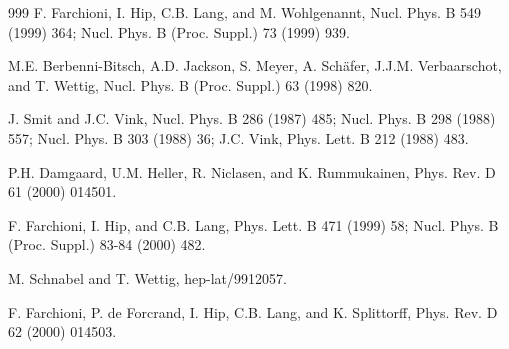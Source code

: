 \begin{thebibliography}{999}
                      F. Farchioni, I. Hip, C.B. Lang, and M. Wohlgenannt,
                      Nucl. Phys. B 549 (1999) 364;           %
                      Nucl. Phys. B (Proc. Suppl.) 73 (1999) 939.     %

  M.E. Berbenni-Bitsch, A.D. Jackson, S. Meyer,
                      A. Sch\"afer, J.J.M. Verbaarschot, and T. Wettig,
                      Nucl. Phys. B (Proc. Suppl.) 63 (1998) 820.     %

      J. Smit and J.C. Vink, 
                      Nucl. Phys. B 286 (1987) 485;         %
                      Nucl. Phys. B 298 (1988) 557;         %
                      Nucl. Phys. B 303 (1988) 36;          %
                      J.C. Vink, 
                      Phys. Lett. B 212 (1988) 483.         %

                      P.H. Damgaard, U.M. Heller, R. Niclasen, and
                      K. Rummukainen, 
                      Phys. Rev. D 61 (2000) 014501.           %

                      F. Farchioni, I. Hip, and C.B. Lang, 
                      Phys. Lett. B 471 (1999) 58;              %
                      Nucl. Phys. B (Proc. Suppl.) 83-84 (2000) 482.

       M. Schnabel and T. Wettig,
                      hep-lat/9912057.                          %

     F. Farchioni, P. de Forcrand, I. Hip, C.B. Lang,
                      and K. Splittorff, 
                      Phys. Rev. D 62 (2000) 014503.


\end{thebibliography}

